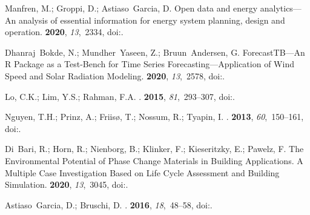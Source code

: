 \documentclass[energies,article,accept,moreauthors,pdftex]{Definitions/mdpi}
\begin{document}
\begin{thebibliography}{999}
Manfren, M.; Groppi, D.; Astiaso~Garcia, D.
\newblock Open data and energy analytics---An analysis of essential information
  for energy system planning, design and operation.
 {\bf 2020}, {\em 13},~2334, 
\newblock
  doi:{\href{https://doi.org/10.1016/j.energy.2020.118803}{}}.

Dhanraj~Bokde, N.; Mundher~Yaseen, Z.; Bruun~Andersen, G.
\newblock ForecastTB---An R Package as a Test-Bench for Time Series
  Forecasting---Application of Wind Speed and Solar Radiation Modeling.
 {\bf 2020}, {\em 13},~2578, 
\newblock
  doi:{\href{https://doi.org/10.3390/en13102578}{}}.

Lo, C.K.; Lim, Y.S.; Rahman, F.A.
.
 {\bf 2015}, {\em 81},~293--307, 
\newblock
  doi:{\href{https://doi.org/10.1016/j.renene.2015.03.047}{}}.

Nguyen, T.H.; Prinz, A.; Friis{\o}, T.; Nossum, R.; Tyapin, I.
.
 {\bf 2013}, {\em 60},~150--161, 
\newblock
  doi:{\href{https://doi.org/10.1016/j.renene.2013.05.002}{}}.

Di~Bari, R.; Horn, R.; Nienborg, B.; Klinker, F.; Kieseritzky, E.; Pawelz, F.
\newblock The Environmental Potential of Phase Change Materials in Building
  Applications. A Multiple Case Investigation Based on Life Cycle Assessment
  and Building Simulation.
 {\bf 2020}, {\em 13},~3045, 
\newblock
  doi:{\href{https://doi.org/10.3390/en13123045}{}}.

Astiaso~Garcia, D.; Bruschi, D.
.
 {\bf 2016},
  {\em 18},~48--58, 
\newblock
  doi:{\href{https://doi.org/10.1016/j.seta.2016.09.009}{}}.


\end{thebibliography}
\end{document}
